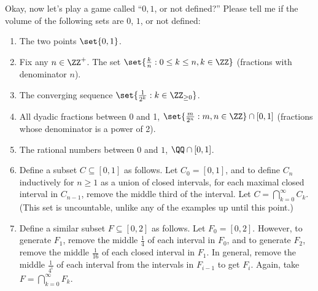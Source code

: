 \documentclass[12pt]{article}
\begin{document}
\noindent Okay, now let's play a game called ``$0, 1$, or not defined?'' Please tell me if
the volume of the following sets are $0$, $1$, or not defined: 
\begin{enumerate}[label=(\alph*)]
  \item The two points $\set{0, 1}$. 
  \item Fix any $n \in \ZZ^+$. The set $\set{\frac k n : 0 \leq k \leq n, k \in
    \ZZ}$ (fractions with denominator $n$).

  \item The converging sequence $\set{\frac 1 {2^k} : k \in \ZZ_{\geq 0}}$.

  \item All dyadic fractions between 0 and 1, $\set{\frac m {2^n} : m, n \in
    \ZZ} \cap [0,1]$ (fractions whose denominator is a power of 2). 
  \item The rational numbers between $0$ and $1$, $\QQ \cap [0, 1]$.

  \item Define a subset $C \subseteq [0,1]$ as follows. Let $C_0 = [0,1]$, and
    to define $C_n$ inductively for $n \geq 1$ as a union of closed intervals, 
    for each maximal closed interval in $C_{n-1}$, remove the middle third of 
    the interval. Let $C = \bigcap_{k=0}^\infty C_k$. (This set is uncountable,
    unlike any of the examples up until this point.)

  \item Define a similar subset $F \subseteq [0,2]$ as follows. Let $F_0 =
    [0,2]$. However, to generate $F_1$, remove the middle $\frac{1}{4}$ of each
    interval in $F_0$, and to generate $F_2$, remove the middle
    $\frac{1}{16}$ of each closed interval in $F_1$. In general, remove the
    middle $\frac{1}{4^i}$ of each interval from the intervals in $F_{i-1}$
    to get $F_i$. Again, take $F = \bigcap_{k=0}^\infty F_k$. 
    

\end{enumerate}
\end{document}
